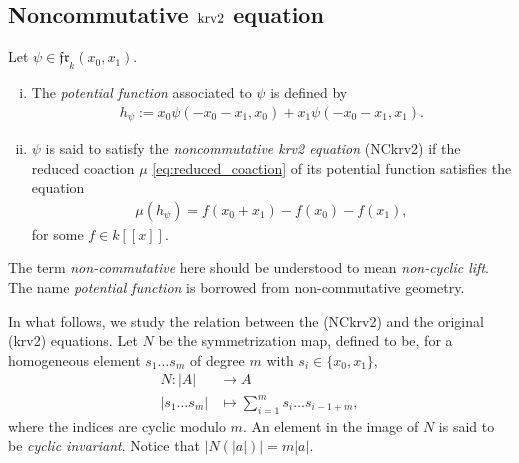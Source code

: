 \documentclass[a4paper,fleqn]{cas-sc}
\begin{document}
\subsection{Noncommutative $\rm{krv2}$ equation}

\begin{definition}
    Let $\psi\in \mathfrak{fr}_k(x_0,x_1)$. 
    \begin{enumerate}[(i)]
        \item The \textit{potential function} associated to $\psi$ is defined by
\begin{align*}
h_{\psi}:=x_0\psi(-x_0-x_1,x_0)+x_1\psi(-x_0-x_1,x_1).
\end{align*}

        \item $\psi$ is said to satisfy the \emph{noncommutative krv2 equation} (NCkrv2) if the reduced coaction $\mu$ \eqref{eq:reduced_coaction} of its potential function satisfies the equation
\begin{align}\label{eq:nonKV}
\mu(h_{\psi})=f(x_0+x_1)-f(x_0)-f(x_1),
\end{align}
for some $f\in k[[x]]$.
    \end{enumerate}

\end{definition}

\begin{rmk}
The term \textit{non-commutative} here should be understood to mean \textit{non-cyclic lift}. The name \textit{potential function} is borrowed from non-commutative geometry.
\end{rmk}


In what follows, we study the relation between the (NCkrv2) and the original (krv2) equations. Let $N$ be the symmetrization map, defined to be, for a homogeneous element $s_1\ldots s_m$ of degree $m$ with $s_i\in \{x_0,x_1\}$,
\begin{align*}
N : |A| & \to A \\
|s_1\ldots s_m| & \mapsto \sum^m_{i=1}s_i\ldots s_{i-1+m},
\end{align*}
where the indices are cyclic modulo $m$. An element in the image of $N$ is said to be \emph{cyclic invariant}. Notice that $|N(|a|)|=m|a|$. 
\end{document}
